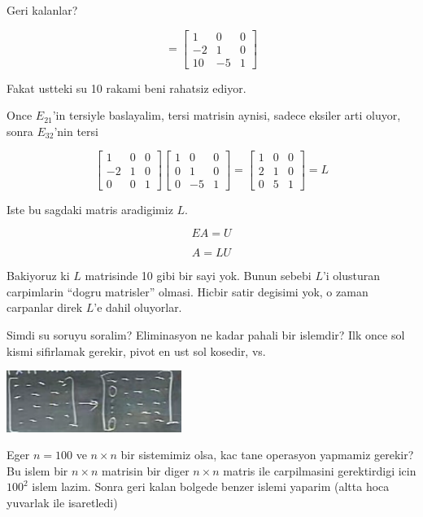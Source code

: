 \documentclass[12pt,fleqn]{article}\usepackage{../common}
\begin{document}
Geri kalanlar? 

\[ = 
\left[\begin{array}{rrr}
1 & 0 & 0 \\
-2 & 1 & 0 \\
10 & -5 & 1
\end{array}\right]
 \]

Fakat ustteki su 10 rakami beni rahatsiz ediyor. 

Once $E_{21}$'in tersiyle baslayalim, tersi matrisin aynisi, sadece eksiler
arti oluyor, sonra  $E_{32}$'nin tersi

\[ 
\left[\begin{array}{rrr}
1 & 0 & 0 \\
-2 & 1 & 0 \\
0 & 0 & 1
\end{array}\right]
\left[\begin{array}{rrr}
1 & 0 & 0 \\
0 & 1 & 0 \\
0 & -5 & 1
\end{array}\right]
=
\left[\begin{array}{rrr}
1 & 0 & 0 \\
2 & 1 & 0 \\
0 & 5 & 1
\end{array}\right] = L
 \]

Iste bu sagdaki matris aradigimiz $L$. 

\[ EA = U \]

\[ A = LU \]

Bakiyoruz ki $L$ matrisinde 10 gibi bir sayi yok. Bunun sebebi $L$'i
olusturan carpimlarin ``dogru matrisler'' olmasi. Hicbir satir degisimi
yok, o zaman carpanlar direk $L$'e dahil oluyorlar. 

Simdi su soruyu soralim? Eliminasyon ne kadar pahali bir islemdir? Ilk once
sol kismi sifirlamak gerekir, pivot en ust sol kosedir, vs.

\includegraphics[height=2cm]{01.png}

Eger $n=100$ ve $n \times n$ bir sistemimiz olsa, kac tane operasyon yapmamiz
gerekir? Bu islem bir  $n \times n$ matrisin bir diger  $n \times n$ matris ile
carpilmasini gerektirdigi icin $100^2$ islem lazim. Sonra geri kalan
bolgede benzer islemi yaparim (altta hoca yuvarlak ile isaretledi)
\end{document}
